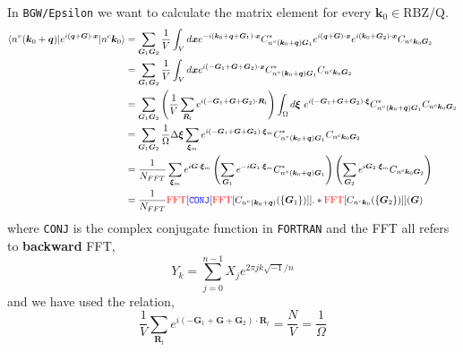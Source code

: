 \documentclass[11pt, oneside]{article}          %
\begin{document}
In {\tt BGW/Epsilon} we want to calculate the matrix element for every ${\bm k}_0 \in \text{RBZ/Q}$.
\begin{equation}
  \label{eq:scalar_EpsilonMatrixElement}
  \begin{aligned}
    \langle n^{v}({\bm k}_0+{\bm q}) | e^{i({\bm q}+{\bm G})\cdot {\bm x}} | n^{c}{\bm k}_0 \rangle & = \sum_{{\bm G}_1 {\bm G}_2} \frac{1}{V} \int_V d{\bm x} e^{-i({\bm k}_0+{\bm q}+{\bm G}_1)\cdot {\bm x}} C^{*}_{n^{v}({\bm k}_0+{\bm q}){\bm G}_1} e^{i({\bm q}+{\bm G})\cdot {\bm x}} e^{i({\bm k}_0+{\bm
        G}_2)\cdot {\bm x}} C_{n^{c}{\bm k}_0 {\bm G}_2} \\
    & = \sum_{{\bm G}_1 {\bm G}_2} \frac{1}{V} \int_{V} d{\bm x} e^{i(-{\bm G}_1+{\bm G}+{\bm G}_2)\cdot {\bm x}} C^{*}_{n^{v}({\bm k}_0+{\bm q}){\bm G}_1} C_{n^{c}{\bm k}_0{\bm G}_2} \\
    & = \sum_{{\bm G}_1{\bm G}_2} \left ( \frac{1}{V} \sum_{{\bm R}_l} e^{i(-{\bm G}_1+{\bm G}+{\bm G}_2)\cdot {\bm R}_l} \right ) \int_{\Omega} d {\bm \xi}~e^{i(-{\bm G}_1 + {\bm G} + {\bm G}_2)\cdot {\bm \xi}} C^{*}_{n^{v}({\bm k}_0+{\bm q}){\bm G}_1} C_{n^{c}{\bm k}_0{\bm G}_2} \\
    & = \sum_{{\bm G}_1 {\bm G}_2} \frac{1}{\Omega} \Delta {\bm \xi} \sum_{{\bm \xi}_m} e^{i(-{\bm G}_1 + {\bm G}+{\bm G}_2)\cdot {\bm \xi}_m} C^{*}_{n^{v}({\bm k}_0+{\bm q}){\bm G}_1} C_{n^{c}{\bm k}_0{\bm G}_2} \\
    & = \frac{1}{N_{FFT}} \sum_{{\bm \xi}_m} e^{i{\bm G}\cdot {\bm \xi}_m} \left ( \sum_{{\bm G}_1} e^{-i{\bm G}_1 \cdot {\bm \xi}_m} C^{*}_{n^{v} ({\bm k}_0+{\bm q}){\bm G}_1} \right ) \left ( \sum_{{\bm G}_2} e^{i{\bm G}_2 \cdot {\bm \xi}_m} C_{n^{c} {\bm k}_0{\bm G}_2} \right ) \\
    & = \frac{1}{N_{FFT}} {\color{red} \text{FFT}}[{\color{blue} \text{{\tt CONJ}}}[{\color{red} \text{FFT}}[C_{n^{v}({\bm k}_0+{\bm q})}(\{ {\bm G}_1 \})]].* {\color{red} \text{FFT}}[C_{n^{c}{\bm k}_0}(\{ {\bm G}_2 \})]]({\bm G})
  \end{aligned}
\end{equation}
where {\color{blue} {\tt CONJ}} is the complex conjugate function in {\tt FORTRAN} and the {\color{red} FFT} all refers to {\bf backward} FFT,
\begin{equation}
  \label{eq:1DBackwardFFT_0}
  Y_k = \sum^{n-1}_{j=0} X_j e^{2\pi j k \sqrt{-1}/n}
\end{equation}
and we have used the relation,
\begin{equation}
  \label{eq:1/N}
  \frac{1}{V} \sum_{{\bm R}_l} e^{i(-{\bm G}_1 + {\bm G}+{\bm G}_2)\cdot {\bm R}_l} = \frac{N}{V} = \frac{1}{\Omega}
\end{equation}
\end{document}

